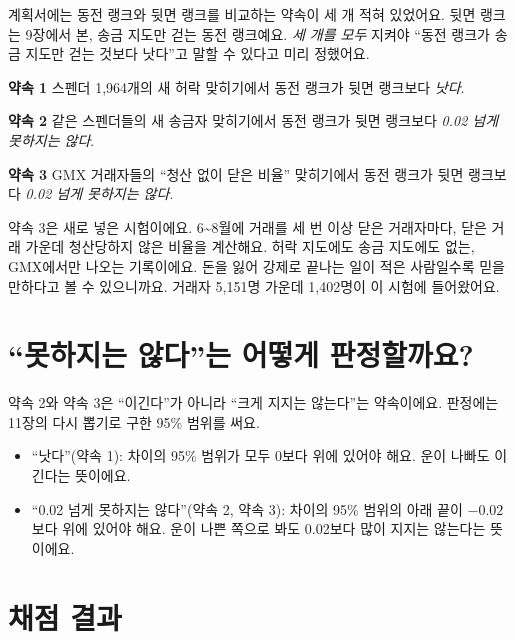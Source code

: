 계획서에는 동전 랭크와 뒷면 랭크를 비교하는 약속이 세 개 적혀 있었어요.
뒷면 랭크는 9장에서 본, 송금 지도만 걷는 동전 랭크예요.
\emph{세 개를 모두} 지켜야 “동전 랭크가 송금 지도만 걷는 것보다 낫다”고 말할 수 있다고 미리 정했어요.

\begin{center}
\begin{tcolorbox}[colback=white, colframe=inkblue, boxrule=0.8pt, arc=2mm, width=0.95\linewidth]
\small
\textbf{약속 1} \quad 스펜더 1,964개의 새 허락 맞히기에서 동전 랭크가 뒷면 랭크보다 \emph{낫다}.\par\smallskip
\textbf{약속 2} \quad 같은 스펜더들의 새 송금자 맞히기에서 동전 랭크가 뒷면 랭크보다 \emph{0.02 넘게 못하지는 않다}.\par\smallskip
\textbf{약속 3} \quad GMX 거래자들의 “청산 없이 닫은 비율” 맞히기에서 동전 랭크가 뒷면 랭크보다 \emph{0.02 넘게 못하지는 않다}.
\end{tcolorbox}
\end{center}

약속 3은 새로 넣은 시험이에요.
6\textasciitilde{}8월에 거래를 세 번 이상 닫은 거래자마다, 닫은 거래 가운데 청산당하지 않은 비율을 계산해요.
허락 지도에도 송금 지도에도 없는, GMX에서만 나오는 기록이에요.
돈을 잃어 강제로 끝나는 일이 적은 사람일수록 믿을 만하다고 볼 수 있으니까요.
거래자 5,151명 가운데 1,402명이 이 시험에 들어왔어요.

\section{“못하지는 않다”는 어떻게 판정할까요?}

약속 2와 약속 3은 “이긴다”가 아니라 “크게 지지는 않는다”는 약속이에요.
판정에는 11장의 다시 뽑기로 구한 95\% 범위를 써요.

\begin{itemize}
\item “낫다”(약속 1): 차이의 95\% 범위가 모두 0보다 위에 있어야 해요. 운이 나빠도 이긴다는 뜻이에요.
\item “0.02 넘게 못하지는 않다”(약속 2, 약속 3): 차이의 95\% 범위의 아래 끝이 $-0.02$보다 위에 있어야 해요.
      운이 나쁜 쪽으로 봐도 0.02보다 많이 지지는 않는다는 뜻이에요.
\end{itemize}

\section{채점 결과}

